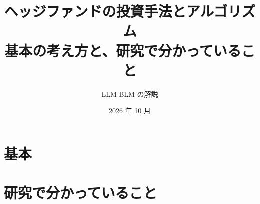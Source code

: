 \documentclass[xelatex,ja=standard,jafont=haranoaji,a4paper,10pt,openany]{bxjsreport}
\title{ヘッジファンドの投資手法とアルゴリズム\\[8pt]
  \Large 基本の考え方と、研究で分かっていること}
\author{LLM-BLM の解説}
\date{2026 年 10 月}
\begin{document}
\maketitle
\setcounter{tocdepth}{1}
{\small\tableofcontents}



\part{基本}












\part{研究で分かっていること}















\appendix




\end{document}
